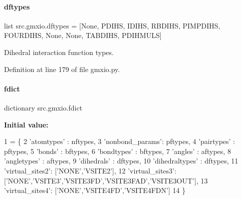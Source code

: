 \paragraph{\texorpdfstring{dftypes}{dftypes}}
{\footnotesize\ttfamily list src.\+gmxio.\+dftypes = \mbox{[}None, \textquotesingle{}P\+D\+I\+HS\textquotesingle{}, \textquotesingle{}I\+D\+I\+HS\textquotesingle{}, \textquotesingle{}R\+B\+D\+I\+HS\textquotesingle{}, \textquotesingle{}P\+I\+M\+P\+D\+I\+HS\textquotesingle{}, \textquotesingle{}F\+O\+U\+R\+D\+I\+HS\textquotesingle{}, None, None, \textquotesingle{}T\+A\+B\+D\+I\+HS\textquotesingle{}, \textquotesingle{}P\+D\+I\+H\+M\+U\+LS\textquotesingle{}\mbox{]}}



Dihedral interaction function types. 



Definition at line 179 of file gmxio.\+py.

\mbox{\label{namespacesrc_1_1gmxio_afe3f61930bba41119de318d11a29dd14}} 
\paragraph{\texorpdfstring{fdict}{fdict}}
{\footnotesize\ttfamily dictionary src.\+gmxio.\+fdict}

{\bfseries Initial value\+:}
\begin{DoxyCode}
1 =  \{
2     \textcolor{stringliteral}{'atomtypes'}     : nftypes,
3     \textcolor{stringliteral}{'nonbond\_params'}: pftypes,
4     \textcolor{stringliteral}{'pairtypes'}     : pftypes,
5     \textcolor{stringliteral}{'bonds'}         : bftypes,
6     \textcolor{stringliteral}{'bondtypes'}     : bftypes,
7     \textcolor{stringliteral}{'angles'}        : aftypes,
8     \textcolor{stringliteral}{'angletypes'}    : aftypes,
9     \textcolor{stringliteral}{'dihedrals'}     : dftypes,
10     \textcolor{stringliteral}{'dihedraltypes'} : dftypes,
11     \textcolor{stringliteral}{'virtual\_sites2'}: [\textcolor{stringliteral}{'NONE'},\textcolor{stringliteral}{'VSITE2'}],
12     \textcolor{stringliteral}{'virtual\_sites3'}: [\textcolor{stringliteral}{'NONE'},\textcolor{stringliteral}{'VSITE3'},\textcolor{stringliteral}{'VSITE3FD'},\textcolor{stringliteral}{'VSITE3FAD'},\textcolor{stringliteral}{'VSITE3OUT'}],
13     \textcolor{stringliteral}{'virtual\_sites4'}: [\textcolor{stringliteral}{'NONE'},\textcolor{stringliteral}{'VSITE4FD'},\textcolor{stringliteral}{'VSITE4FDN'}]
14     \}
\end{DoxyCode}


